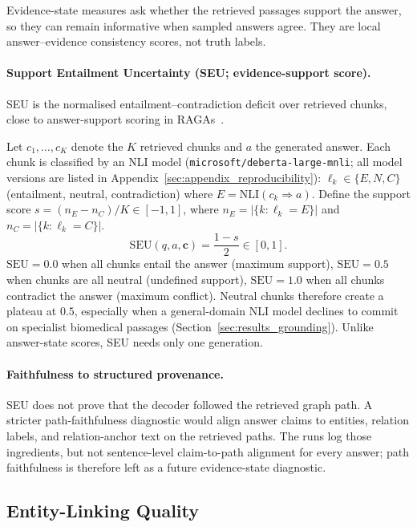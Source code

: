 Evidence-state measures ask whether the retrieved passages support the answer,
so they can remain informative when sampled answers agree.
They are local answer--evidence consistency scores, not truth labels.

\paragraph{Support Entailment Uncertainty (SEU; evidence-support score).}
SEU is the normalised entailment--contradiction deficit over retrieved chunks,
close to answer-support scoring in RAGAs~\citep{es2024ragas}.

Let $c_1,\ldots,c_K$ denote the $K$ retrieved chunks and $a$ the generated answer.
Each chunk is classified by an NLI model
(\texttt{microsoft/deberta-large-mnli}; all model versions are listed in
Appendix~\ref{sec:appendix_reproducibility}):
$\ell_k \in \{E, N, C\}$ (entailment, neutral, contradiction) where
$E = \mathrm{NLI}(c_k \Rightarrow a)$.
Define the support score $s = (n_E - n_C)/K \in [-1, 1]$,
where $n_E = |\{k: \ell_k=E\}|$ and $n_C = |\{k: \ell_k=C\}|$.
\begin{equation}
  \mathrm{SEU}(q, a, \mathbf{c}) = \frac{1 - s}{2} \in [0, 1].
\end{equation}
$\mathrm{SEU} = 0.0$ when all chunks entail the answer (maximum support),
$\mathrm{SEU} = 0.5$ when chunks are all neutral (undefined support),
$\mathrm{SEU} = 1.0$ when all chunks contradict the answer (maximum conflict).
Neutral chunks therefore create a plateau at $0.5$, especially when a
general-domain NLI model declines to commit on specialist biomedical passages
(Section~\ref{sec:results_grounding}). Unlike answer-state scores, SEU needs
only one generation.

\paragraph{Faithfulness to structured provenance.}
SEU does not prove that the decoder followed the retrieved graph path.
A stricter path-faithfulness diagnostic would align answer claims to entities,
relation labels, and relation-anchor text on the retrieved paths.
The runs log those ingredients, but not sentence-level claim-to-path alignment
for every answer; path faithfulness is therefore left as a future
evidence-state diagnostic.

\subsection{Entity-Linking Quality}
\label{sec:grounding}

